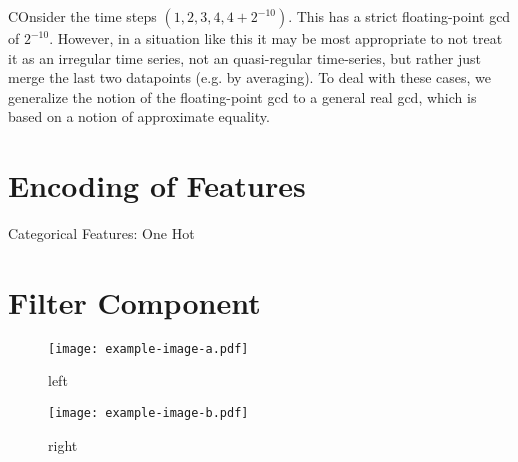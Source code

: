 \documentclass[a4paper,11pt,reqno]{scrartcl}
\begin{document}
%
\begin{example}[title]\label{ex: label}%
  COnsider the time steps $(1,2,3,4,4+2^{-10})$. This has a strict floating-point gcd of $2^{-10}$. However, in a situation like this it may be most appropriate to not treat it as an irregular time series, not an quasi-regular time-series, but rather just merge the last two datapoints (e.g. by averaging). To deal with these cases, we generalize the notion of the floating-point gcd to a general real gcd, which is based on a notion of approximate equality.
\end{example}%




\section{Encoding of Features}

Categorical Features: One Hot


\section{Filter Component}



\begin{figure}[h!]
\begin{minipage}[t]{.4\textwidth}\centering
  \texttt{[image: example-image-a.pdf]}
  \caption{left}\label{table a}
\end{minipage}%
\begin{minipage}[t]{.6\textwidth}\centering
  \texttt{[image: example-image-b.pdf]}
  \caption{right}\label{table b}
\end{minipage}
\end{figure}
\end{document}
